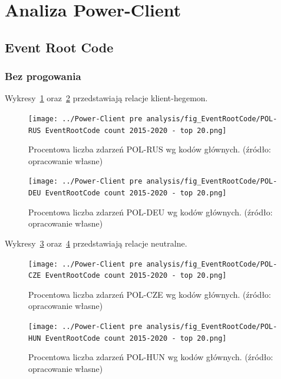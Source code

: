 \documentclass[11pt]{report}
\begin{document}
    \section{Analiza Power-Client}

    \subsection{Event Root Code}

    \subsubsection{Bez progowania}\label{subsubsec:erc:bez-progowania}

    Wykresy~\ref{fig:Power-Client:ERC:POL-RUS} oraz~\ref{fig:Power-Client:ERC:POL-DEU} przedstawiają relacje klient-hegemon.

    \begin{figure}[!htp]
        \centering
        \texttt{[image: ../Power-Client pre analysis/fig\_EventRootCode/POL-RUS EventRootCode count 2015-2020 - top 20.png]}
        \caption{Procentowa liczba zdarzeń POL-RUS wg kodów głównych. (źródło: opracowanie własne)}
        \label{fig:Power-Client:ERC:POL-RUS}
    \end{figure}

    \begin{figure}[!htp]
        \centering
        \texttt{[image: ../Power-Client pre analysis/fig\_EventRootCode/POL-DEU EventRootCode count 2015-2020 - top 20.png]}
        \caption{Procentowa liczba zdarzeń POL-DEU wg kodów głównych. (źródło: opracowanie własne)}
        \label{fig:Power-Client:ERC:POL-DEU}
    \end{figure}

    Wykresy~\ref{fig:Power-Client:ERC:POL-CZE} oraz~\ref{fig:Power-Client:ERC:POL-HUN} przedstawiają relacje neutralne.

    \begin{figure}[!htp]
        \centering
        \texttt{[image: ../Power-Client pre analysis/fig\_EventRootCode/POL-CZE EventRootCode count 2015-2020 - top 20.png]}
        \caption{Procentowa liczba zdarzeń POL-CZE wg kodów głównych. (źródło: opracowanie własne)}
        \label{fig:Power-Client:ERC:POL-CZE}
    \end{figure}

    \begin{figure}[!htp]
        \centering
        \texttt{[image: ../Power-Client pre analysis/fig\_EventRootCode/POL-HUN EventRootCode count 2015-2020 - top 20.png]}
        \caption{Procentowa liczba zdarzeń POL-HUN wg kodów głównych. (źródło: opracowanie własne)}
        \label{fig:Power-Client:ERC:POL-HUN}
    \end{figure}
\end{document}

